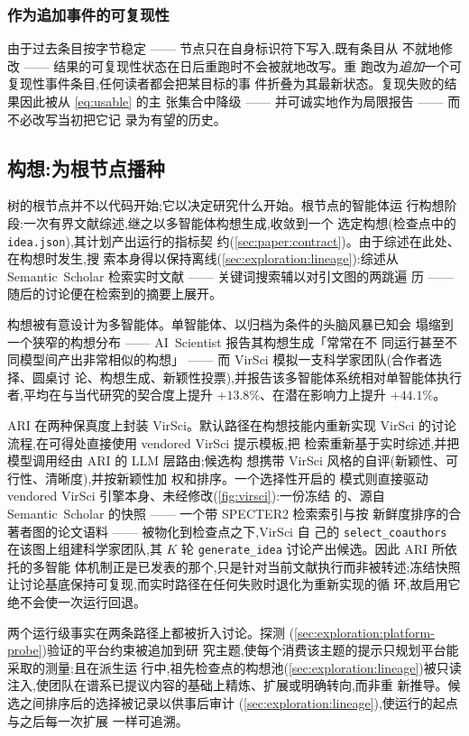 \subsubsection*{作为追加事件的可复现性}

由于过去条目按字节稳定 —— 节点只在自身标识符下写入,既有条目从
不就地修改 —— 结果的可复现性状态在日后重跑时不会被就地改写。重
跑改为\emph{追加}一个可复现性事件条目,任何读者都会把某目标的事
件折叠为其最新状态。复现失败的结果因此被从 \cref{eq:usable} 的主
张集合中降级 —— 并可诚实地作为局限报告 —— 而不必改写当初把它记
录为有望的历史。

\subsection{构想:为根节点播种}\label{sec:exploration:ideation}

树的根节点并不以代码开始;它以决定研究什么开始。根节点的智能体运
行构想阶段:一次有界文献综述,继之以多智能体构想生成,收敛到一个
选定构想(检查点中的 \texttt{idea.json}),其计划产出运行的指标契
约(\cref{sec:paper:contract})。由于综述在此处、在构想时发生,搜
索本身得以保持离线(\cref{sec:exploration:lineage}):综述从
Semantic~Scholar 检索实时文献 —— 关键词搜索辅以对引文图的两跳遍
历 —— 随后的讨论便在检索到的摘要上展开。

构想被有意设计为多智能体。单智能体、以归档为条件的头脑风暴已知会
塌缩到一个狭窄的构想分布 —— AI~Scientist 报告其构想生成「常常在不
同运行甚至不同模型间产出非常相似的构想」\cite{lu2024ai} —— 而
VirSci \cite{su2024many} 模拟一支科学家团队(合作者选择、圆桌讨
论、构想生成、新颖性投票),并报告该多智能体系统相对单智能体执行
者,平均在与当代研究的契合度上提升 $+13.8\%$、在潜在影响力上提升
$+44.1\%$。

ARI 在两种保真度上封装 VirSci。默认路径在构想技能内重新实现
VirSci 的讨论流程,在可得处直接使用 vendored VirSci 提示模板,把
检索重新基于实时综述,并把模型调用经由 ARI 的 LLM 层路由;候选构
想携带 VirSci 风格的自评(新颖性、可行性、清晰度),并按新颖性加
权和排序。一个选择性开启的 模式则直接驱动
vendored VirSci 引擎本身、未经修改(\cref{fig:virsci}):一份冻结
的、源自 Semantic~Scholar 的快照 —— 一个带 SPECTER2 检索索引与按
新鲜度排序的合著者图的论文语料 —— 被物化到检查点之下,VirSci 自
己的 \texttt{select\_coauthors} 在该图上组建科学家团队,其 $K$
轮 \texttt{generate\_idea} 讨论产出候选。因此 ARI 所依托的多智能
体机制正是已发表的那个,只是针对当前文献执行而非被转述;冻结快照
让讨论基底保持可复现,而实时路径在任何失败时退化为重新实现的循
环,故启用它绝不会使一次运行回退。

两个运行级事实在两条路径上都被折入讨论。探测
(\cref{sec:exploration:platform-probe})验证的平台约束被追加到研
究主题,使每个消费该主题的提示只规划平台能采取的测量;且在派生运
行中,祖先检查点的构想池(\cref{sec:exploration:lineage})被只读
注入,使团队在谱系已提议内容的基础上精炼、扩展或明确转向,而非重
新推导。候选之间排序后的选择被记录以供事后审计
(\cref{sec:exploration:lineage}),使运行的起点与之后每一次扩展
一样可追溯。
